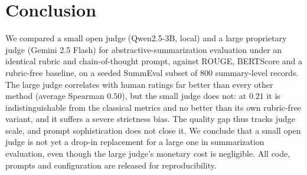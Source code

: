 \documentclass[runningheads]{llncs}
\begin{document}
\section{Conclusion}
We compared a small open judge (Qwen2.5-3B, local) and a large proprietary judge
(Gemini 2.5 Flash) for abstractive-summarization evaluation under an identical rubric
and chain-of-thought prompt, against ROUGE, BERTScore and a rubric-free baseline, on
a seeded SummEval subset of $800$ summary-level records. The large judge correlates
with human ratings far better than every other method (average Spearman $0.50$), but
the small judge does not: at $0.21$ it is indistinguishable from the classical
metrics and no better than its own rubric-free variant, and it suffers a severe
strictness bias. The quality gap thus tracks judge scale, and prompt sophistication
does not close it. We conclude that a small open judge is not yet a drop-in
replacement for a large one in summarization evaluation, even though the large
judge's monetary cost is negligible. All code, prompts and configuration are released
for reproducibility.



\end{document}
